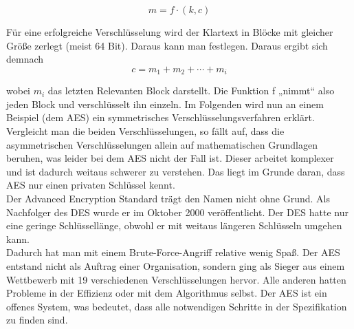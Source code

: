 \begin{equation}
	m = f \cdot (k,c)
\end{equation}

Für eine erfolgreiche Verschlüsselung wird der Klartext in Blöcke mit gleicher Größe zerlegt (meist 64 Bit). Daraus kann man festlegen. Daraus ergibt sich demnach \\

\begin{equation}
	c = m_1 + m_2 + \cdots + m_i
\end{equation}


wobei $m_i$ das letzten Relevanten Block darstellt. Die Funktion f „nimmt“ also jeden Block und verschlüsselt ihn einzeln. Im Folgenden wird nun an einem Beispiel (dem AES) ein symmetrisches Verschlüsselungsverfahren erklärt. Vergleicht man die beiden Verschlüsselungen, so fällt auf, dass die asymmetrischen Verschlüsselungen allein auf mathematischen Grundlagen beruhen, was leider bei dem AES nicht der Fall ist. Dieser arbeitet komplexer und ist dadurch weitaus schwerer zu verstehen.
Das liegt im Grunde daran, dass AES nur einen privaten Schlüssel kennt.\\

Der Advanced Encryption Standard trägt den Namen nicht ohne Grund. Als Nachfolger des DES wurde er im Oktober 2000 veröffentlicht. Der DES hatte nur eine geringe Schlüssellänge, obwohl er mit weitaus längeren Schlüsseln umgehen kann.\\

Dadurch hat man mit einem Brute-Force-Angriff relative wenig Spaß. Der AES entstand nicht als Auftrag einer Organisation, sondern ging als Sieger aus einem Wettbewerb mit 19 verschiedenen Verschlüsselungen hervor. Alle anderen hatten Probleme in der Effizienz oder mit dem Algorithmus selbst. Der AES ist ein offenes System, was bedeutet, dass alle notwendigen Schritte in der Spezifikation zu finden sind.\\

